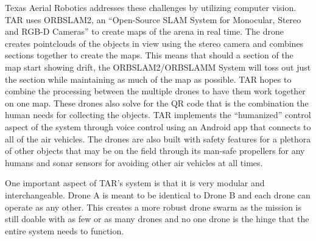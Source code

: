 \documentclass[12pt,letterpaper]{article}
\begin{document}
	Texas Aerial Robotics addresses these challenges by utilizing computer vision. TAR uses ORBSLAM2, an ``Open-Source SLAM System for Monocular, Stereo and RGB-D Cameras'' to create maps of the arena in real time. The drone creates pointclouds of the objects in view using the stereo camera and combines sections together to create the maps. This means that should a section of the map start showing drift, the ORBSLAM2/ORBSLAMM System will toss out just the section while maintaining as much of the map as possible. TAR hopes to combine the processing between the multiple drones to have them work together on one map. These drones also solve for the QR code that is the combination the human needs for collecting the objects. TAR implements the ``humanized'' control aspect of the system through voice control using an Android app that connects to all of the air vehicles. The drones are also built with safety features for a plethora of other objects that may be on the field through its man-safe propellers for any humans and sonar sensors for avoiding other air vehicles at all times.

	One important aspect of TAR’s system is that it is very modular and interchangeable. Drone A is meant to be identical to Drone B and each drone can operate as any other. This creates a more robust drone swarm as the mission is still doable with as few or as many drones and no one drone is the hinge that the entire system needs to function.
\end{document}
